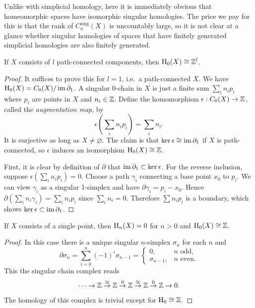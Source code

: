 Unlike with simplicial homology, here it is immediately obvious that homeomorphic spaces have isomorphic singular homologies. The price we pay for this is that the rank of $C^{\text{sing}}_n(X)$ is uncountably large, so it is not clear at a glance whether singular homologies of spaces that have finitely generated simplicial homologies are also finitely generated. 

\begin{prop}
    If $X$ consists of $l$ path-connected components, then $\mathrm{H}_0(X)\cong \mathbb{Z}^l$.
\end{prop}
\begin{proof}
     It suffices to prove this for $l=1$, i.e.\ a path-connected $X$. We have $\mathrm{H}_0(X)=C_0(X)/\operatorname{im}\partial_1$. A singular 0-chain in $X$ is just a finite sum $\sum_i n_i p_i$ where $p_i$ are points in $X$ and $n_i\in\mathbb{Z}$. Define the homomorphism $\epsilon:C_0(X)\to \mathbb{Z}$, called the \emph{augmentation map}, by
     \[\epsilon\left(\sum_i n_i p_i\right)=\sum_i n_i.\]
     It is surjective as long as $X\neq\varnothing$. The claim is that $\ker\epsilon\cong\operatorname{im}\partial_1$ if $X$ is path-connected, so $\epsilon $ induces an isomorphism $\mathrm{H}_0(X)\cong \mathbb{Z}$.
     
     First, it is clear by definition of $\partial$ that $\operatorname{im}\partial_1\subset\ker\epsilon$. For the reverse inclusion, suppose $\epsilon(\sum_i n_i p_i)=0$. Choose a path $\gamma_i$ connecting a base point $x_0$ to $p_i$. We can view $\gamma_i$ as a singular 1-simplex and have $\partial\gamma_i=p_i-x_0$. Hence $\partial(\sum_i n_i\gamma_i)=\sum_i n_i p_i$ since $\sum_i n_i=0$. Therefore $\sum n_i p_i$ is a boundary, which shows $\ker\epsilon\subset\operatorname{im}\partial_1$.
\end{proof}

\begin{prop}
    If $X$ consists of a single point, then $\mathrm{H}_n(X)=0$ for $n>0$ and $\mathrm{H}_0(X)\cong \mathbb{Z}$.
\end{prop}
\begin{proof}
     In this case there is a unique singular $n$-simplex $\sigma_n$ for each $n$ and 
     \[\partial\sigma_n=\sum_{i=0}^n(-1)^i\sigma_{n-1}=\begin{cases}
     0,& n\text{ odd},\\
     \sigma_{n-1},& n\text{ even}.
     \end{cases}\]
     This the singular chain complex reads
     \[\cdots\to \mathbb{Z}\overset\cong\to \mathbb{Z}\overset 0\to \mathbb{Z}\overset\cong\to\mathbb{Z}\overset 0\to\mathbb{Z}\to 0.\]
     The homology of this complex is trivial except for $\mathrm{H}_0\cong \mathbb{Z} $.
\end{proof}

